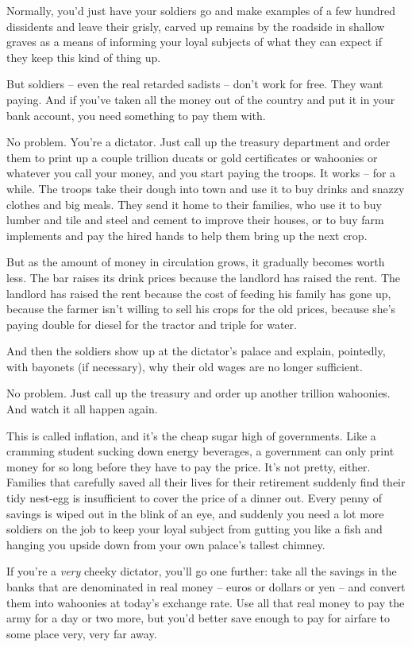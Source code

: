 Normally, you'd just have your soldiers go and make examples of a
few hundred dissidents and leave their grisly, carved up remains by
the roadside in shallow graves as a means of informing your loyal
subjects of what they can expect if they keep this kind of thing
up.

But soldiers -- even the real retarded sadists -- don't work for
free. They want paying. And if you've taken all the money out of
the country and put it in your bank account, you need something to
pay them with.

No problem. You're a dictator. Just call up the treasury department
and order them to print up a couple trillion ducats or gold
certificates or wahoonies or whatever you call your money, and you
start paying the troops. It works -- for a while. The troops take
their dough into town and use it to buy drinks and snazzy clothes
and big meals. They send it home to their families, who use it to
buy lumber and tile and steel and cement to improve their houses,
or to buy farm implements and pay the hired hands to help them
bring up the next crop.

But as the amount of money in circulation grows, it gradually
becomes worth less. The bar raises its drink prices because the
landlord has raised the rent. The landlord has raised the rent
because the cost of feeding his family has gone up, because the
farmer isn't willing to sell his crops for the old prices, because
she's paying double for diesel for the tractor and triple for
water.

And then the soldiers show up at the dictator's palace and explain,
pointedly, with bayonets (if necessary), why their old wages are no
longer sufficient.

No problem. Just call up the treasury and order up another trillion
wahoonies. And watch it all happen again.

This is called inflation, and it's the cheap sugar high of
governments. Like a cramming student sucking down energy beverages,
a government can only print money for so long before they have to
pay the price. It's not pretty, either. Families that carefully
saved all their lives for their retirement suddenly find their tidy
nest-egg is insufficient to cover the price of a dinner out. Every
penny of savings is wiped out in the blink of an eye, and suddenly
you need a lot more soldiers on the job to keep your loyal subject
from gutting you like a fish and hanging you upside down from your
own palace's tallest chimney.

If you're a \emph{very} cheeky dictator, you'll go one further:
take all the savings in the banks that are denominated in real
money -- euros or dollars or yen -- and convert them into wahoonies
at today's exchange rate. Use all that real money to pay the army
for a day or two more, but you'd better save enough to pay for
airfare to some place very, very far away.

